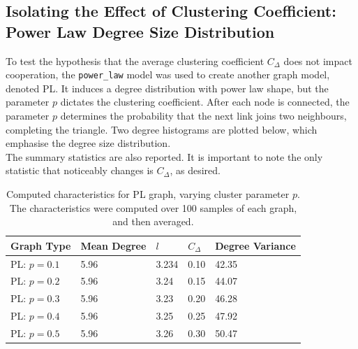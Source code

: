 \subsection{Isolating the Effect of Clustering Coefficient: Power Law Degree Size Distribution}
To test the hypothesis that the average clustering coefficient $C_\Delta$ does not impact cooperation, the \verb+power_law+ model was used to create another graph model, denoted PL. It induces a degree distribution with power law shape, but the parameter $p$ dictates the clustering coefficient. After each node is connected, the parameter $p$ determines the probability that the next link joins two neighbours, completing the triangle. Two degree histograms are plotted below, which emphasise the degree size distribution. \\
\FloatBarrier
{}
\FloatBarrier
{}
\FloatBarrier
The summary statistics are also reported. It is important to note the only statistic that noticeably changes is $C_\Delta$, as desired. \\
\FloatBarrier
\begin{table}[!h]
\begin{center}
\begin{tabular}{|l|l|l|l|l|}
\hline
Graph Type & Mean Degree & $l$ & $C_\Delta$ & Degree Variance \\ \hline
PL: $p=0.1$        & 5.96        & 3.234                         & 0.10                   & 42.35           \\ \hline
PL: $p=0.2$        & 5.96           & 3.24                         & 0.15                   & 44.07               \\ \hline
PL: $p=0.3$       & 5.96        & 3.23                       & 0.20                   & 46.28           \\ \hline
PL: $p=0.4$       & 5.96        & 3.25                         & 0.25                   & 47.92           \\ \hline
PL: $p=0.5$         & 5.96           & 3.26                         & 0.30                   & 50.47            \\ \hline
\end{tabular}
\caption{Computed characteristics for PL graph, varying cluster parameter $p$. The characteristics were computed over 100 samples of each graph, and then averaged. } \label{graph_stats}
\end{center}
\end{table}
